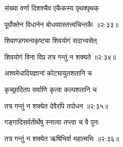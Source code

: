 {\devanagarifont संख्या वर्णा दिशश्चैव एकैकस्य पृथक्पृथक् \thinspace{\dandab} \dontdisplaylinenum }%


{\devanagarifont पूर्वोक्तेन विधानेन बोधव्यास्तत्त्वचिन्तकैः {॥२:३३॥} \veg\dontdisplaylinenum }%

{\devanagarifont शिवाण्डगमनाकृष्ट्या शिवयोगं सदाभ्यसेत् \thinspace{\dandab} \dontdisplaylinenum }%


{\devanagarifont शिवयोगं विना विप्र तत्र गन्तुं न शक्यते {॥२:३४॥} \veg\dontdisplaylinenum }%

{\devanagarifont अश्वमेधादियज्ञानां कोट्यायुतशतानि च \thinspace{\dandab} \dontdisplaylinenum }%
 
{\devanagarifont कृच्छ्रादितप सर्वाणि कृत्वा कल्पशतानि च  \danda\dontdisplaylinenum }%


{\devanagarifont तत्र गन्तुं न शक्येत देवैरपि तपोधन {॥२:३५॥} \veg\dontdisplaylinenum }%

{\devanagarifont गङ्गादिसर्वतीर्थेषु स्नात्वा तप्त्वा च वै पुनः \thinspace{\dandab} \dontdisplaylinenum }%
 

{\devanagarifont तत्र गन्तुं न शक्येत ऋषिभिर्वा महात्मभिः {॥२:३६॥} \veg\dontdisplaylinenum }%


